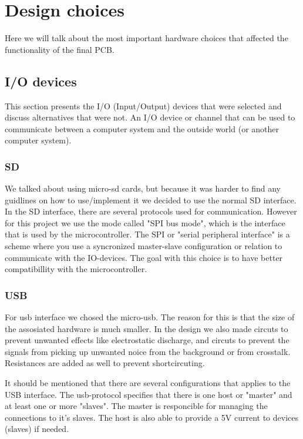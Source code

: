 \section {Design choices}

Here we will talk about the most important hardware choices that affected the functionality of the final PCB.

\subsection{I/O devices} \label{pcb:design-choices:ss:IO_devices}
This section presents the I/O (Input/Output) devices that were selected and discuss alternatives that were not.
An I/O device or channel that can be used to communicate between a computer system and the outside world (or another computer system).

\subsubsection{SD}
We talked about using micro-sd cards, but because it was harder to find any guidlines on how to use/implement it we decided to use the normal SD interface.
In the SD interface, there are several protocols used for communication. 
However for this project we use the mode called "SPI bus mode", which is the interface that is used by the microcontroller.  
The SPI or "serial peripheral interface" is a scheme where you use a syncronized master-slave configuration or relation to communicate with the IO-devices. 
The goal with this choice is to have better compatibillity with the microcontroller.

\subsubsection{USB}
For usb interface we chosed the micro-usb. 
The reason for this is that the size of the assosiated hardware is much smaller.
In the design we also made circuts to prevent unwanted effects like electrostatic discharge, and circuts to prevent the signals from picking up unwanted noice from the background or from crosstalk.
Resistances are added as well to prevent shortcircuting.

It should be mentioned that there are several configurations that applies to the USB interface. The usb-protocol
specifies that there is one host or "master" and at least one or more "slaves". The master is responcible for managing the connections
to it's slaves. The host is also able to provide a 5V current to devices (slaves) if needed.

